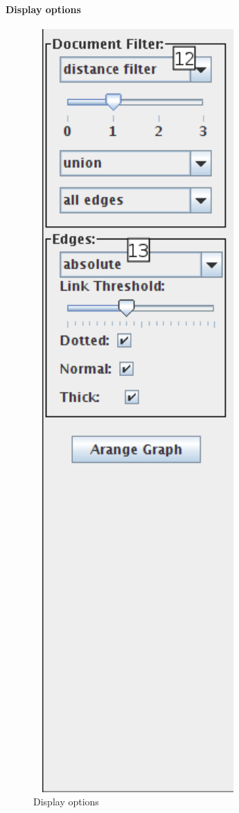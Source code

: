\paragraph{Display options}

\begin{figure}[h]
\centering
\caption{Display options}
\includegraphics[width=80mm]{displayopts.png}
\end{figure}

